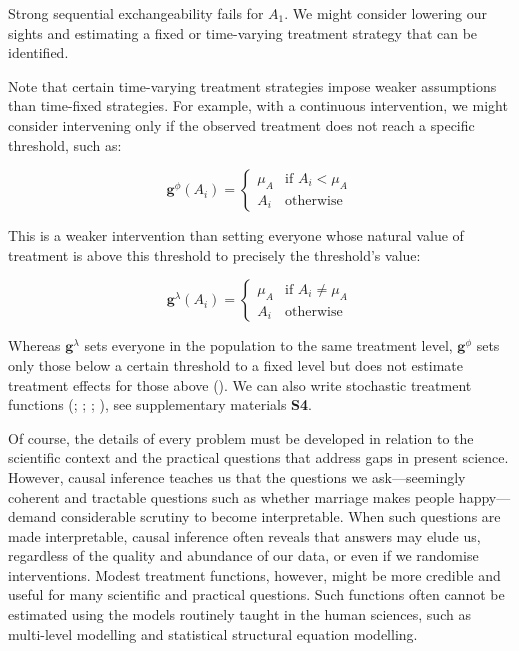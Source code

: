 \documentclass[
  single column]{article}
\begin{document}
Strong sequential exchangeability fails for \(A_1\). We might consider
lowering our sights and estimating a fixed or time-varying treatment
strategy that can be identified.

Note that certain time-varying treatment strategies impose weaker
assumptions than time-fixed strategies. For example, with a continuous
intervention, we might consider intervening only if the observed
treatment does not reach a specific threshold, such as:

\[
\mathbf{g}^{\phi} (A_i) = \begin{cases}  
\mu_A & \text{if } A_i < \mu_A \\ 
A_i & \text{otherwise} 
\end{cases}
\]

This is a weaker intervention than setting everyone whose natural value
of treatment is above this threshold to precisely the threshold's value:

\[
\mathbf{g}^{\lambda} (A_i) = \begin{cases}   
\mu_A & \text{if } A_i \neq \mu_A \\ 
A_i & \text{otherwise} 
\end{cases}
\]

Whereas \(\mathbf{g}^{\lambda}\) sets everyone in the population to the
same treatment level, \(\mathbf{g}^{\phi}\) sets only those below a
certain threshold to a fixed level but does not estimate treatment
effects for those above (). We can also write stochastic treatment functions
(;
;
;
), see
supplementary materials \textbf{S4}.

Of course, the details of every problem must be developed in relation to
the scientific context and the practical questions that address gaps in
present science. However, causal inference teaches us that the questions
we ask---seemingly coherent and tractable questions such as whether
marriage makes people happy---demand considerable scrutiny to become
interpretable. When such questions are made interpretable, causal
inference often reveals that answers may elude us, regardless of the
quality and abundance of our data, or even if we randomise
interventions. Modest treatment functions, however, might be more
credible and useful for many scientific and practical questions. Such
functions often cannot be estimated using the models routinely taught in
the human sciences, such as multi-level modelling and statistical
structural equation modelling.
\end{document}
